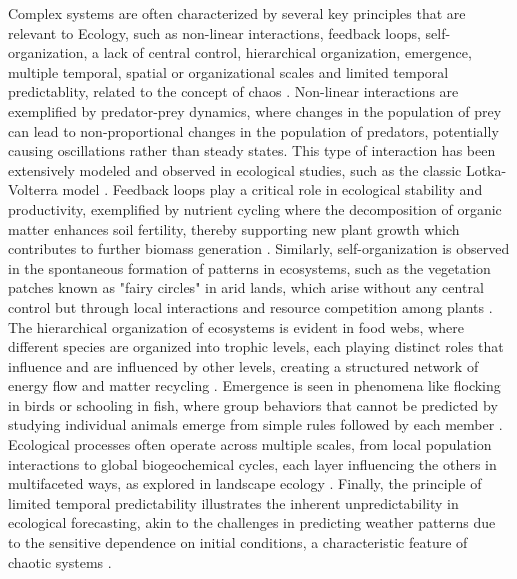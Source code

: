 Complex systems are often characterized by several key principles that are
relevant to Ecology, such as non-linear interactions, feedback loops,
self-organization, a lack of central control, hierarchical organization,
emergence, multiple temporal, spatial or organizational scales and limited
temporal predictablity, related to the concept of chaos \cite{Bianconi_2023}.
Non-linear interactions are exemplified by predator-prey dynamics, where
changes in the population of prey can lead to non-proportional changes in the
population of predators, potentially causing oscillations rather than steady
states. This type of interaction has been extensively modeled and observed in
ecological studies, such as the classic Lotka-Volterra model \cite{Lotka1925}.
Feedback loops play a critical role in ecological stability and productivity,
exemplified by nutrient cycling where the decomposition of organic matter
enhances soil fertility, thereby supporting new plant growth which contributes
to further biomass generation \cite{DeAngelis1980}. Similarly,
self-organization is observed in the spontaneous formation of patterns in
ecosystems, such as the vegetation patches known as "fairy circles" in arid
lands, which arise without any central control but through local interactions
and resource competition among plants \cite{Tarnita2017}. The hierarchical
organization of ecosystems is evident in food webs, where
different species are organized into trophic levels, each playing distinct
roles that influence and are influenced by other levels, creating a structured
network of energy flow and matter recycling \cite{Pimm1982}. Emergence is seen
in phenomena like flocking in birds or schooling in fish, where group behaviors
that cannot be predicted by studying individual animals emerge from simple
rules followed by each member \cite{Couzin2005}. Ecological processes often
operate across multiple scales, from local population interactions to global
biogeochemical cycles, each layer influencing the others in multifaceted ways,
as explored in landscape ecology \cite{Turner2005}. Finally, the principle of
limited temporal predictability illustrates the inherent unpredictability in
ecological forecasting, akin to the challenges in predicting weather patterns
due to the sensitive dependence on initial conditions, a characteristic feature
of chaotic systems \cite{Lorenz1963}.


